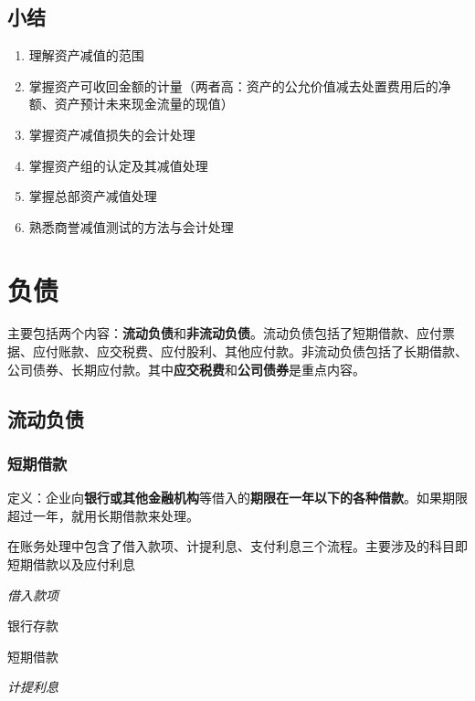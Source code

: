 \documentclass[UTF8,12pt]{ctexart}
\newenvironment{Dr}{%
	\begin{list}{}%
		{
			\setlength{\leftmargin}{2em}
			\setlength{\labelwidth}{2em}
			\setlength{\labelsep}{0pt}
			\setlength{\itemindent}{0pt}
			\setlength{\listparindent}{0pt}
			\setlength{\parsep}{0pt}
			\setlength{\topsep}{0pt}
		}
		\item[\textbf{借：}]
	}{%
	\end{list}
}
\newenvironment{Cr}{%
	\begin{list}{}%
		{
			\setlength{\leftmargin}{3em}
			\setlength{\labelwidth}{2em}
			\setlength{\labelsep}{0pt}
			\setlength{\itemindent}{0pt}
			\setlength{\listparindent}{0pt}
			\setlength{\parsep}{0pt}
			\setlength{\topsep}{0pt}
		}
		\item[\textbf{贷：}]
	}{%
	\end{list}
}
\numberwithin{equation}{section} %
\numberwithin{figure}{section}
\numberwithin{table}{section}
\begin{document}
	\subsection{小结}
	\begin{enumerate}
		\item 理解资产减值的范围
		
		\item 掌握资产可收回金额的计量（两者高：资产的公允价值减去处置费用后的净额、资产预计未来现金流量的现值）
		
		\item 掌握资产减值损失的会计处理
		
		\item 掌握资产组的认定及其减值处理
		
		\item 掌握总部资产减值处理
		
		\item 熟悉商誉减值测试的方法与会计处理 
	\end{enumerate}
	
	\newpage
	\section{负债}
	主要包括两个内容：\textbf{流动负债}和\textbf{非流动负债}。流动负债包括了短期借款、应付票据、应付账款、应交税费、应付股利、其他应付款。非流动负债包括了长期借款、公司债券、长期应付款。其中\textbf{应交税费}和\textbf{公司债券}是重点内容。
	
	\subsection{流动负债}
	
	\subsubsection{短期借款}
	定义：企业向\textbf{银行或其他金融机构}等借入的\textbf{期限在一年以下的各种借款}。如果期限超过一年，就用长期借款来处理。
	
	在账务处理中包含了借入款项、计提利息、支付利息三个流程。主要涉及的科目即短期借款以及应付利息
	
	\textit{借入款项}
	
	\begin{Dr}
		银行存款
	\end{Dr}
	\begin{Cr}
		短期借款
	\end{Cr}

	
	\textit{计提利息}
	
\end{document}
